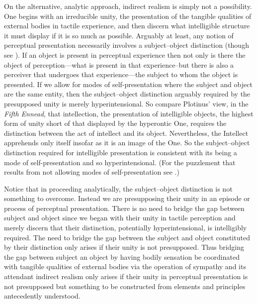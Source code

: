 \documentclass[12pt]{article}
\begin{document}
On the alternative, analytic approach, indirect realism is simply not a possibility. One begins with an irreducible unity, the presentation of the tangible qualities of external bodies in tactile experience, and then discern what intelligible structure it must display if it is so much as possible. Arguably at least, any notion of perceptual presentation necessarily involves a subject--object distinction (though see \citealt{Johnston:2007qy}). If an object is present in perceptual experience then not only is there the object of perception---what is present in that experience--but there is also a perceiver that undergoes that experience---the subject to whom the object is presented. If we allow for modes of self-presentation where the subject and object are the same entity, then the subject--object distinction arguably required by the presupposed unity is merely hyperintensional. So compare Plotinus' view, in the \emph{Fifth Ennead}, that intellection, the presentation of intelligible objects, the highest form of unity short of that displayed by the hyperontic One, requires the distinction between the act of intellect and its object. Nevertheless, the Intellect apprehends only itself insofar as it is an image of the One. So the subject--object distinction required for intelligible presentation is consistent with its being a mode of self-presentation and so hyperintensional. (For the puzzlement that results from not allowing modes of self-presentation see \citealt{Yrjonsuuri:2008aa}.)  

Notice that in proceeding analytically, the subject--object distinction is not something to overcome. Instead we are presupposing their unity in an episode or process of perceptual presentation. There is no need to bridge the gap between subject and object since we began with their unity in tactile perception and merely discern that their distinction, potentially hyperintensional, is intelligibly required. The need to bridge the gap between the subject and object constituted by their distinction only arises if their unity is not presupposed. Thus bridging the gap between subject an object by having bodily sensation be coordinated with tangible qualities of external bodies via the operation of sympathy and its attendant indirect realism only arises if their unity in perceptual presentation is not presupposed but something to be constructed from elements and principles antecedently understood. 
\end{document}
